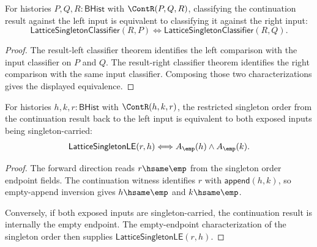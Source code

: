 \begin{theorem}
\label{thm:lattice-singleton-classifier-continuation-result-left-right}
For histories $P,Q,R:\mathsf{BHist}$ with $\ContR(P,Q,R)$, classifying the
continuation result against the left input is equivalent to classifying it
against the right input:
$$
\mathsf{LatticeSingletonClassifier}(R,P)
\Longleftrightarrow
\mathsf{LatticeSingletonClassifier}(R,Q).
$$
\end{theorem}
\begin{proof}
The result-left classifier theorem identifies the left comparison with the
input classifier on $P$ and $Q$. The result-right classifier theorem identifies
the right comparison with the same input classifier. Composing those two
characterizations gives the displayed equivalence.
\end{proof}

\begin{theorem}
\label{thm:lattice-singleton-le-continuation-result-left-carriers}
For histories $h,k,r:\mathsf{BHist}$ with $\ContR(h,k,r)$, the restricted
singleton order from the continuation result back to the left input is
equivalent to both exposed inputs being singleton-carried:
$$
\mathsf{LatticeSingletonLE}(r,h)
\Longleftrightarrow
A_{\emp}(h)\land A_{\emp}(k).
$$
\end{theorem}
\begin{proof}
The forward direction reads $r\hsame\emp$ from the singleton order endpoint
fields. The continuation witness identifies $r$ with
$\mathsf{append}(h,k)$, so empty-append inversion gives
$h\hsame\emp$ and $k\hsame\emp$.

Conversely, if both exposed inputs are singleton-carried, the continuation
result is internally the empty endpoint. The empty-endpoint characterization
of the singleton order then supplies
$\mathsf{LatticeSingletonLE}(r,h)$.
\end{proof}

